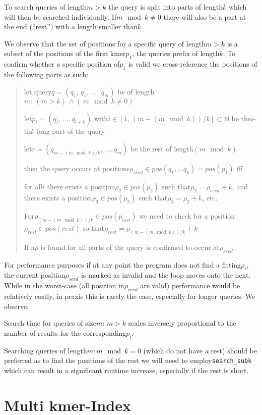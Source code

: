 To search queries of length$m>k$ the query is split into parts of
length$k$ which will then be searched individually. If$m\mod k\neq0$
there will also be a part at the end (``rest'') with a length smaller
than$k$.

We observe that the set of positions for a specific query of length$m>k$
is a subset of the positions of the first kmer$p_{1}$, the queries
prefix of length$k$. To confirm whether a specific position of$p_{1}$
is valid we cross-reference the positions of the following parts as
such:
\begin{verse}
let query$q=(q_{1},\,q_{1},\,...,\,q_{m})$ be of length$m:\:(m>k)\,\land(\,m\mod k\neq\text{0})$

let$p_{i}=(q_{i},\,...,q_{i+k})$ with$i\in[1,\,(m-(m\mod k))/k]\subset\mathbb{N}$
be the$i$-th$k$-long part of the query

let$r=(q_{m-(m\mod k)/k},\,...,q_{m})$ be the rest of length$(m\mod k)$

then the query occurs at positions$\rho_{seed}\in pos(q_{1},...q_{k})=pos(p_{1})$
iff

for all$i$ there exists a position$\rho_{2}\in pos(p_{2})$ such
that$\rho_{2}=\rho_{seed}+k$, and there exists a position$\rho_{3}\in pos(p_{3})$
such that$\rho_{3}=\rho_{2}+k$, etc.

For$\rho_{(m-(m\mod k))/k}\in pos(p_{last})$ we need to check for
a position$\rho_{rest}\in pos(rest)$ so that$\rho_{rest}=\rho_{(m-(m\mod k))/k}+k$

If a$\rho$ is found for all parts of the query is confirmed to occur
at$\rho_{seed}$
\end{verse}
For performance purposes if at any point the program does not find
a fitting$\rho_{i}$, the current position$\rho_{seed}$ is marked
as invalid and the loop moves onto the next. While in the worst-case
(all position in$\rho_{seed}$ are valid) performance would be relatively
costly, in praxis this is rarely the case, especially for longer queries.
We observe:
\begin{lem}
\label{Lemma 3}Search time for queries of size$m:\,m>k$ scales inversely
proportional to the number of results for the corresponding$p_{i}$.
\end{lem}
Searching queries of length$m:m\mod k=0$ (which do not have a rest)
should be preferred as to find the positions of the rest we will need
to employ\lstinline{search_subk} which can result in a significant
runtime increase, especially if the rest is short.\pagebreak{}

\chapter{Multi kmer-Index}

